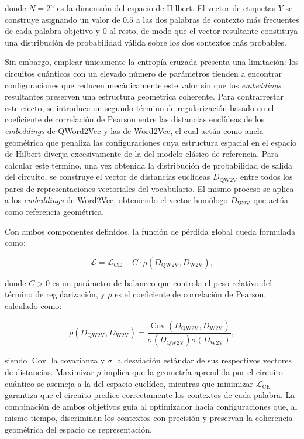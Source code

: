 donde $N = 2^n$ es la dimensión del espacio de Hilbert. El vector de etiquetas $Y$ se construye asignando un valor de $0.5$ a las dos palabras de contexto más frecuentes de cada palabra objetivo y $0$ al resto, de modo que el vector resultante constituya una distribución de probabilidad válida sobre los dos contextos más probables.

Sin embargo, emplear únicamente la entropía cruzada presenta una limitación: los circuitos cuánticos con un elevado número de parámetros tienden a encontrar configuraciones que reducen mecánicamente este valor sin que los \textit{embeddings} resultantes preserven una estructura geométrica coherente. Para contrarrestar este efecto, se introduce un segundo término de regularización basado en el coeficiente de correlación de Pearson entre las distancias euclídeas de los \textit{embeddings} de QWord2Vec y las de Word2Vec, el cual actúa como ancla geométrica que penaliza las configuraciones cuya estructura espacial en el espacio de Hilbert diverja excesivamente de la del modelo clásico de referencia. Para calcular este término, una vez obtenida la distribución de probabilidad de salida del circuito, se construye el vector de distancias euclídeas $D_\text{QW2V}$ entre todos los pares de representaciones vectoriales del vocabulario. El mismo proceso se aplica a los \textit{embeddings} de Word2Vec, obteniendo el vector homólogo $D_\text{W2V}$ que actúa como referencia geométrica.

Con ambos componentes definidos, la función de pérdida global queda formulada como:

\[
  \mathcal{L} = \mathcal{L}_{\text{CE}} - C \cdot \rho(D_{\text{QW2V}}, D_{\text{W2V}}),
\]

donde $C > 0$ es un parámetro de balanceo que controla el peso relativo del término de regularización, y $\rho$ es el coeficiente de correlación de Pearson, calculado como:

\[
  \rho(D_{\text{QW2V}}, D_{\text{W2V}}) = \frac{\operatorname{Cov}(D_{\text{QW2V}}, D_{\text{W2V}})}{\sigma(D_{\text{QW2V}}) \sigma(D_{\text{W2V}})},
\]

siendo $\operatorname{Cov}$ la covarianza y $\sigma$ la desviación estándar de sus respectivos vectores de distancias. Maximizar $\rho$ implica que la geometría aprendida por el circuito cuántico se asemeja a la del espacio euclídeo, mientras que minimizar $\mathcal{L}_{\text{CE}}$ garantiza que el circuito predice correctamente los contextos de cada palabra. La combinación de ambos objetivos guía al optimizador hacia configuraciones que, al mismo tiempo, discriminan los contextos con precisión y preservan la coherencia geométrica del espacio de representación.


